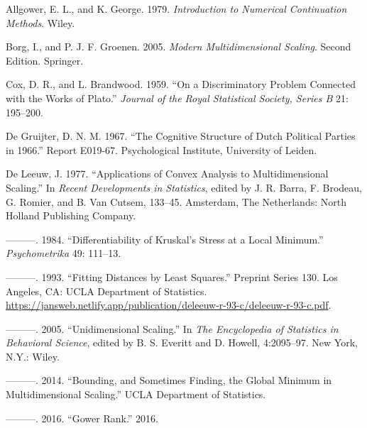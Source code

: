 \documentclass[
  12pt,
]{article}
\newlength{\cslhangindent}
\newlength{\cslentryspacingunit} %
\newenvironment{CSLReferences}[2] %
 {%
  \setlength{\parindent}{0pt}
  \ifodd #1
  \let\oldpar\par
  \def\par{\hangindent=\cslhangindent\oldpar}
  \fi
  \setlength{\parskip}{#2\cslentryspacingunit}
 }%
 {}
\begin{document}
\hypertarget{refs}{}
\begin{CSLReferences}{1}{0}
\leavevmode{}%
Allgower, E. L., and K. George. 1979. \emph{Introduction to Numerical
Continuation Methods}. Wiley.

\leavevmode{}%
Borg, I., and P. J. F. Groenen. 2005. \emph{Modern Multidimensional
Scaling}. Second Edition. Springer.

\leavevmode{}%
Cox, D. R., and L. Brandwood. 1959. {``{On a Discriminatory Problem
Connected with the Works of Plato}.''} \emph{Journal of the Royal
Statistical Society, Series B} 21: 195--200.

\leavevmode{}%
De Gruijter, D. N. M. 1967. {``{The Cognitive Structure of Dutch
Political Parties in 1966}.''} Report E019-67. Psychological Institute,
University of Leiden.

\leavevmode{}%
De Leeuw, J. 1977. {``Applications of Convex Analysis to
Multidimensional Scaling.''} In \emph{Recent Developments in
Statistics}, edited by J. R. Barra, F. Brodeau, G. Romier, and B. Van
Cutsem, 133--45. Amsterdam, The Netherlands: North Holland Publishing
Company.

\leavevmode{}%
---------. 1984. {``{Differentiability of Kruskal's Stress at a Local
Minimum}.''} \emph{Psychometrika} 49: 111--13.

\leavevmode{}%
---------. 1993. {``Fitting Distances by Least Squares.''} Preprint
Series 130. Los Angeles, CA: UCLA Department of Statistics.
\url{https://jansweb.netlify.app/publication/deleeuw-r-93-c/deleeuw-r-93-c.pdf}.

\leavevmode{}%
---------. 2005. {``{Unidimensional Scaling}.''} In \emph{The
Encyclopedia of Statistics in Behavioral Science}, edited by B. S.
Everitt and D. Howell, 4:2095--97. New York, N.Y.: Wiley.

\leavevmode{}%
---------. 2014. {``{Bounding, and Sometimes Finding, the Global Minimum
in Multidimensional Scaling}.''} UCLA Department of Statistics.

\leavevmode{}%
---------. 2016. {``Gower Rank.''} 2016.


\end{CSLReferences}
\end{document}
